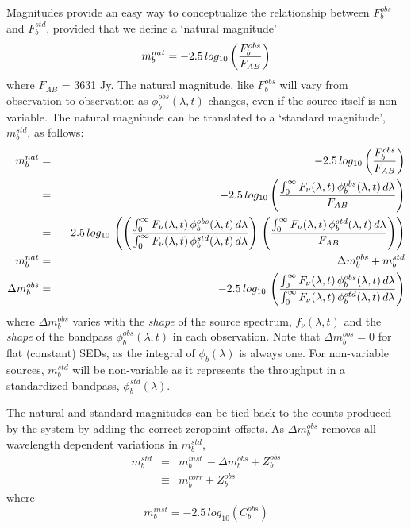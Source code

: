 \documentclass[12pt,preprint]{aastex}
\begin{document}
Magnitudes provide an easy way to conceptualize the relationship
between $F_b^{obs}$ and $F_b^{std}$, provided that we define a
`natural magnitude' 
\begin{equation}
\label{eqn:natmag}
m_b^{nat}  = -2.5\, log_{10} \left( {F_b^{obs} \over F_{AB}}  \right)
\end{equation}
where $F_{AB}$ = 3631 Jy. The natural magnitude, like $F_b^{obs}$ will
vary from observation to observation as $\phi_b^{obs}(\lambda,t)$
changes, even if the source itself is non-variable. The natural
magnitude can be translated to a `standard magnitude', $m_b^{std}$, as
follows:
\begin{eqnarray}
m_b^{nat} & = &-2.5\, log_{10} \left( {F_b^{obs} \over F_{AB}} \right) \\
& = & -2.5 \, log_{10} \left( { \int_0^\infty {F_\nu(\lambda,t) \,
    \phi_b^{obs}(\lambda,t) \, d\lambda} \over F_{AB} }  \right) \\
& = & -2.5 \, log_{10} \, \left( \left( { \int_0^\infty {F_\nu(\lambda,t) \,
    \phi_b^{obs}(\lambda,t) \, d\lambda} \over \int_0^\infty {F_\nu(\lambda,t) \,
    \phi_b^{std}(\lambda,t) \, d\lambda}} \right) \, \left( {\int_0^\infty {F_\nu(\lambda,t) \,
    \phi_b^{std}(\lambda,t) \, d\lambda} \over F_{AB}} \right) \right) \\
m_b^{nat} & = & \Delta m_b^{obs} + m_b^{std} \\
\label{eqn:Delta_m}
\Delta m_b^{obs} & = & -2.5 \, log_{10} \,  \left( { \int_0^\infty {F_\nu(\lambda,t) \,
    \phi_b^{obs}(\lambda,t) \, d\lambda} \over \int_0^\infty {F_\nu(\lambda,t) \,
    \phi_b^{std}(\lambda,t) \, d\lambda}} \right)
\end{eqnarray}
where $\Delta m_b^{obs}$ varies with the {\it shape} of the source
spectrum, $f_\nu(\lambda,t)$ and the {\it shape} of the bandpass
$\phi_b^{obs}(\lambda,t)$ in each observation. Note that $\Delta
m_b^{obs}=0$ for flat (constant) SEDs, as the integral of
$\phi_b(\lambda)$ is always one.  For non-variable sources,
$m_b^{std}$ will be non-variable as it represents the throughput in a
standardized bandpass, $\phi_b^{std}(\lambda)$.

The natural and standard magnitudes can be tied back to the counts
produced by the system by adding the correct zeropoint offsets. As
$\Delta m_b^{obs}$ removes all wavelength dependent variations in $m_b^{std}$,
\begin{eqnarray}
\label{eqn:mag2counts}
m_b^{std} & = & m_b^{inst} \, - \Delta m_b^{obs} + Z_b^{obs} \\
 & \equiv & m_b^{corr} + Z_b^{obs}
\end{eqnarray}
where
\begin{equation}
m_b^{inst} = -2.5\,log_{10}(C_b^{obs})
\end{equation}
\end{document}

